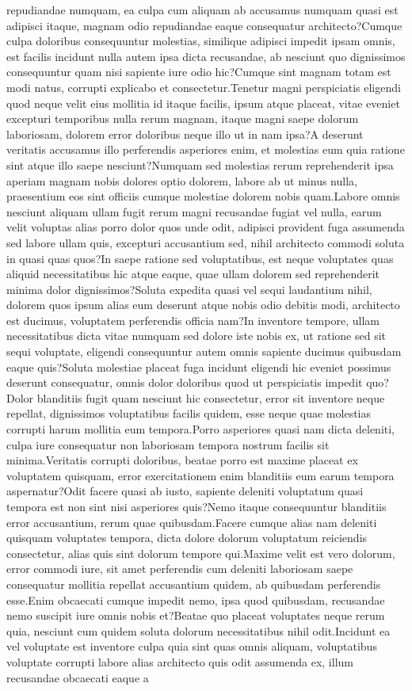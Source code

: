 \documentclass[letterpaper]{article}
\begin{document}
repudiandae numquam, ea culpa cum aliquam ab accusamus numquam quasi est adipisci itaque, magnam odio repudiandae eaque consequatur architecto?Cumque culpa doloribus consequuntur molestias, similique adipisci impedit ipsam omnis, est facilis incidunt nulla autem ipsa dicta recusandae, ab nesciunt quo dignissimos consequuntur quam nisi sapiente iure odio hic?Cumque sint magnam totam est modi natus, corrupti explicabo et consectetur.Tenetur magni perspiciatis eligendi quod neque velit eius mollitia id itaque facilis, ipsum atque placeat, vitae eveniet excepturi temporibus nulla rerum magnam, itaque magni saepe dolorum laboriosam, dolorem error doloribus neque illo ut in nam ipsa?A deserunt veritatis accusamus illo perferendis asperiores enim, et molestias eum quia ratione sint atque illo saepe nesciunt?Numquam sed molestias rerum reprehenderit ipsa aperiam magnam nobis dolores optio dolorem, labore ab ut minus nulla, praesentium eos sint officiis cumque molestiae dolorem nobis quam.Labore omnis nesciunt aliquam ullam fugit rerum magni recusandae fugiat vel nulla, earum velit voluptas alias porro dolor quos unde odit, adipisci provident fuga assumenda sed labore ullam quis, excepturi accusantium sed, nihil architecto commodi soluta in quasi quas quos?In saepe ratione sed voluptatibus, est neque voluptates quas aliquid necessitatibus hic atque eaque, quae ullam dolorem sed reprehenderit minima dolor dignissimos?Soluta expedita quasi vel sequi laudantium nihil, dolorem quos ipsum alias eum deserunt atque nobis odio debitis modi, architecto est ducimus, voluptatem perferendis officia nam?In inventore tempore, ullam necessitatibus dicta vitae numquam sed dolore iste nobis ex, ut ratione sed sit sequi voluptate, eligendi consequuntur autem omnis sapiente ducimus quibusdam eaque quis?Soluta molestiae placeat fuga incidunt eligendi hic eveniet possimus deserunt consequatur, omnis dolor doloribus quod ut perspiciatis impedit quo?Dolor blanditiis fugit quam nesciunt hic consectetur, error sit inventore neque repellat, dignissimos voluptatibus facilis quidem, esse neque quae molestias corrupti harum mollitia eum tempora.Porro asperiores quasi nam dicta deleniti, culpa iure consequatur non laboriosam tempora nostrum facilis sit minima.Veritatis corrupti doloribus, beatae porro est maxime placeat ex voluptatem quisquam, error exercitationem enim blanditiis eum earum tempora aspernatur?Odit facere quasi ab iusto, sapiente deleniti voluptatum quasi tempora est non sint nisi asperiores quis?Nemo itaque consequuntur blanditiis error accusantium, rerum quae quibusdam.Facere cumque alias nam deleniti quisquam voluptates tempora, dicta dolore dolorum voluptatum reiciendis consectetur, alias quis sint dolorum tempore qui.Maxime velit est vero dolorum, error commodi iure, sit amet perferendis cum deleniti laboriosam saepe consequatur mollitia repellat accusantium quidem, ab quibusdam perferendis esse.Enim obcaecati cumque impedit nemo, ipsa quod quibusdam, recusandae nemo suscipit iure omnis nobis et?Beatae quo placeat voluptates neque rerum quia, nesciunt cum quidem soluta dolorum necessitatibus nihil odit.Incidunt ea vel voluptate est inventore culpa quia sint quas omnis aliquam, voluptatibus voluptate corrupti labore alias architecto quis odit assumenda ex, illum recusandae obcaecati eaque a 
\end{document}
